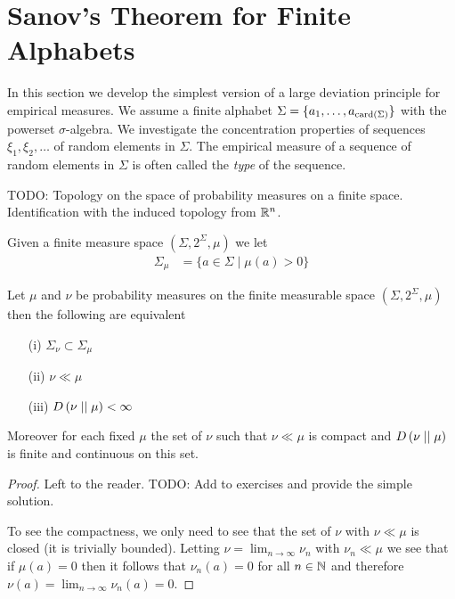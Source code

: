 \section{Sanov's Theorem for Finite Alphabets}

In this section we develop the simplest version of a large deviation
principle for empirical measures.  We assume a finite alphabet
$\Sigma = \lbrace a_1, \dotsc, a_{\operatorname*{card}(\Sigma)} \rbrace$ with the powerset
$\sigma$-algebra.  We investigate the concentration properties of 
sequences $\xi_1, \xi_2, \dotsc$ of random elements in $\Sigma$.  
The empirical measure of a sequence of random
elements in $\Sigma$ is often called the \emph{type} of the sequence.  

TODO: Topology on the space of probability measures on a finite space.  Identification with the induced topology from $\mathbb{R}^n$.

\begin{defn}Given a finite measure space $(\Sigma, 2^\Sigma, \mu)$ we let 
\begin{align*}
\Sigma_\mu &= \lbrace a \in \Sigma \mid \mu(a) > 0 \rbrace
\end{align*}
\end{defn}

\begin{prop}\label{FiniteProbabilityMeasuresAbsoluteContinuity}Let $\mu$ and $\nu$ be probability measures on the finite measurable space $(\Sigma, 2^\Sigma, \mu)$ then
the following are equivalent
\begin{itemize}
\item[(i)]$\Sigma_\nu \subset \Sigma_\mu$
\item[(ii)] $\nu \ll \mu$
\item[(iii)] $D\left( \nu \mid\mid \mu \right) < \infty$
\end{itemize}
Moreover for each fixed $\mu$ the set of $\nu$ such that $\nu \ll \mu$ is compact and $D\left( \nu \mid\mid \mu \right)$ is finite and continuous on this set.
\end{prop}
\begin{proof}
Left to the reader.  TODO: Add to exercises and provide the simple solution.

To see the compactness, we only need to see that the set of $\nu$ with $\nu \ll \mu$ is closed (it is trivially bounded).  Letting $\nu = \lim_{n \to \infty} \nu_n$ with $\nu_n \ll \mu$ we see that if $\mu(a) = 0$ then it follows that $\nu_n(a) = 0$ for all $n \in \mathbb{N}$ and therefore $\nu(a) = \lim_{n \to \infty} \nu_n(a) = 0$.
\end{proof}


